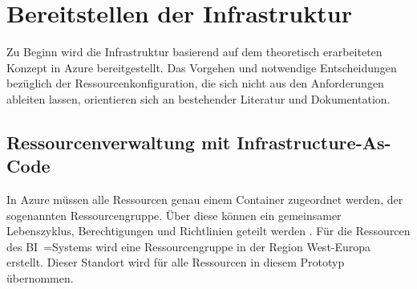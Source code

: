 \section{Bereitstellen der Infrastruktur} \label{sec:infra}
Zu Beginn wird die Infrastruktur basierend auf dem theoretisch erarbeiteten Konzept in Azure bereitgestellt. Das Vorgehen und notwendige Entscheidungen bezüglich der Ressourcenkonfiguration, die sich nicht aus den Anforderungen ableiten lassen, orientieren sich an bestehender Literatur und Dokumentation.

\subsection{Ressourcenverwaltung mit Infrastructure-As-Code} \label{subsec:infra:konfig:iac}
In Azure müssen alle Ressourcen genau einem Container zugeordnet werden, der sogenannten Ressourcengruppe. Über diese können ein gemeinsamer Lebenszyklus, Berechtigungen und Richtlinien geteilt werden \cite{rendon_deploy_2022}. Für die Ressourcen des BI~=Systems wird eine Ressourcengruppe in der Region West-Europa erstellt. Dieser Standort wird für alle Ressourcen in diesem Prototyp übernommen.

